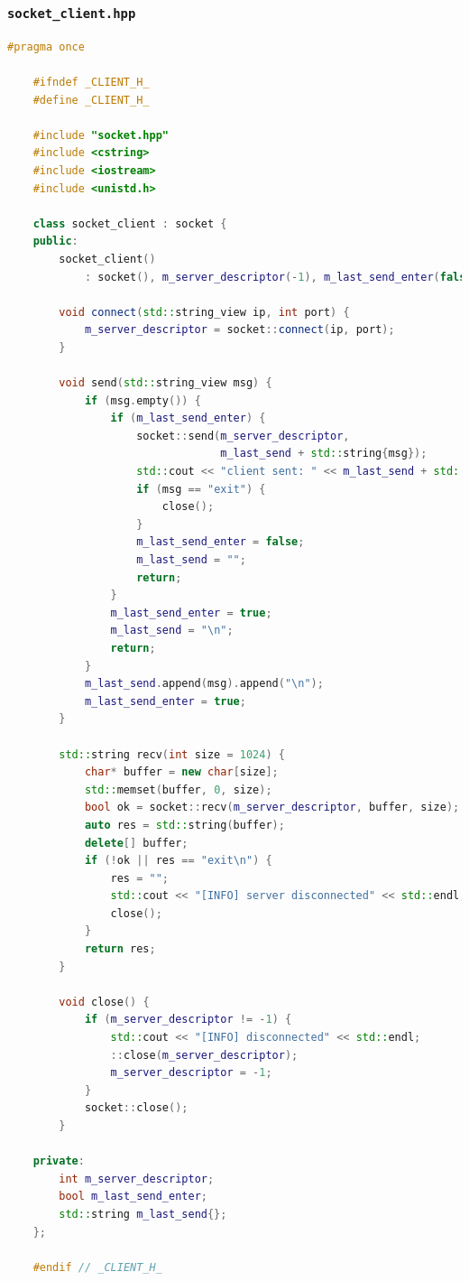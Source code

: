 \documentclass{article}
\begin{document}
\subsubsection{\texttt{socket\_client.hpp}}

\begin{lstlisting}[language=C++]
    #pragma once

    #ifndef _CLIENT_H_
    #define _CLIENT_H_
    
    #include "socket.hpp"
    #include <cstring>
    #include <iostream>
    #include <unistd.h>
    
    class socket_client : socket {
    public:
        socket_client()
            : socket(), m_server_descriptor(-1), m_last_send_enter(false) {}
    
        void connect(std::string_view ip, int port) {
            m_server_descriptor = socket::connect(ip, port);
        }
    
        void send(std::string_view msg) {
            if (msg.empty()) {
                if (m_last_send_enter) {
                    socket::send(m_server_descriptor,
                                 m_last_send + std::string{msg});
                    std::cout << "client sent: " << m_last_send + std::string{msg} << std::endl;
                    if (msg == "exit") {
                        close();
                    }
                    m_last_send_enter = false;
                    m_last_send = "";
                    return;
                }
                m_last_send_enter = true;
                m_last_send = "\n";
                return;
            }
            m_last_send.append(msg).append("\n");
            m_last_send_enter = true;
        }
    
        std::string recv(int size = 1024) {
            char* buffer = new char[size];
            std::memset(buffer, 0, size);
            bool ok = socket::recv(m_server_descriptor, buffer, size);
            auto res = std::string(buffer);
            delete[] buffer;
            if (!ok || res == "exit\n") {
                res = "";
                std::cout << "[INFO] server disconnected" << std::endl;
                close();
            }
            return res;
        }
    
        void close() {
            if (m_server_descriptor != -1) {
                std::cout << "[INFO] disconnected" << std::endl;
                ::close(m_server_descriptor);
                m_server_descriptor = -1;
            }
            socket::close();
        }
    
    private:
        int m_server_descriptor;
        bool m_last_send_enter;
        std::string m_last_send{};
    };
    
    #endif // _CLIENT_H_    
\end{lstlisting}
\end{document}
